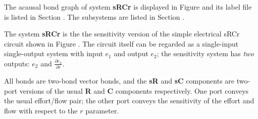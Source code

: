 

   The acausal bond graph of system \textbf{sRCr} is
   displayed in Figure  and its label
   file is listed in Section .
   The subsystems are listed in Section .

The system \textbf{sRCr} is the the sensitivity version  of the simple
electrical sRCr circuit shown in Figure . The circuit itself can be
regarded as a single-input single-output system with input $e_1$ and
output $e_2$; the sensitivity system has {\em two\/} outputs: $e_2$
and $\frac{\partial e_2}{\partial r}$.

All bonds are two-bond vector bonds, and the {\bf sR} and {\bf sC}
components are two-port versions of the usual {\bf R} and {\bf C}
components respectively. One port conveys the usual effort/flow pair;
the other port conveys the sensitivity of the effort and flow with
respect to the $r$ parameter.

